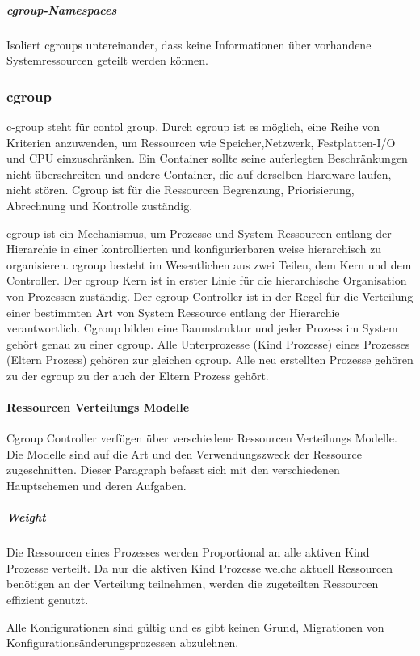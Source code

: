 \subparagraph{cgroup-Namespaces}
Isoliert cgroups untereinander, dass keine Informationen über vorhandene Systemressourcen geteilt werden können.



\subsubsection{cgroup}
\glqq c-group\grqq{} steht für \glqq contol group\grqq{}. Durch cgroup ist es möglich, eine Reihe von Kriterien anzuwenden, um Ressourcen wie Speicher,Netzwerk, Festplatten-I/O und CPU einzuschränken. Ein Container sollte seine auferlegten Beschränkungen nicht überschreiten und andere Container, die auf derselben Hardware laufen, nicht stören. Cgroup ist für die Ressourcen Begrenzung, Priorisierung, Abrechnung und Kontrolle zuständig.

cgroup ist ein Mechanismus, um Prozesse und System Ressourcen entlang der Hierarchie in einer kontrollierten und konfigurierbaren weise hierarchisch zu organisieren. cgroup besteht im Wesentlichen aus zwei Teilen, dem Kern und dem Controller. Der cgroup Kern ist in erster Linie für die hierarchische Organisation von Prozessen zuständig. Der cgroup Controller ist in der Regel für die Verteilung einer bestimmten Art von System Ressource entlang der Hierarchie verantwortlich. Cgroup bilden eine Baumstruktur und jeder Prozess im System gehört genau zu einer cgroup. Alle Unterprozesse (Kind Prozesse) eines Prozesses (Eltern Prozess) gehören zur gleichen cgroup. Alle neu erstellten Prozesse gehören zu der cgroup zu der auch der Eltern Prozess gehört.\cite{Heo2015ControlV2} 


\paragraph{Ressourcen Verteilungs Modelle}
Cgroup Controller verfügen über verschiedene Ressourcen Verteilungs Modelle. Die Modelle sind auf die Art und den Verwendungszweck der Ressource zugeschnitten. Dieser Paragraph befasst sich mit den verschiedenen Hauptschemen und deren Aufgaben.

\subparagraph{Weight}
Die Ressourcen eines Prozesses werden Proportional an alle aktiven Kind Prozesse verteilt. Da nur die aktiven Kind Prozesse welche aktuell Ressourcen benötigen an der Verteilung teilnehmen, werden die zugeteilten Ressourcen effizient genutzt. 

Alle Konfigurationen sind gültig und es gibt keinen Grund, Migrationen von Konfigurationsänderungsprozessen abzulehnen.

